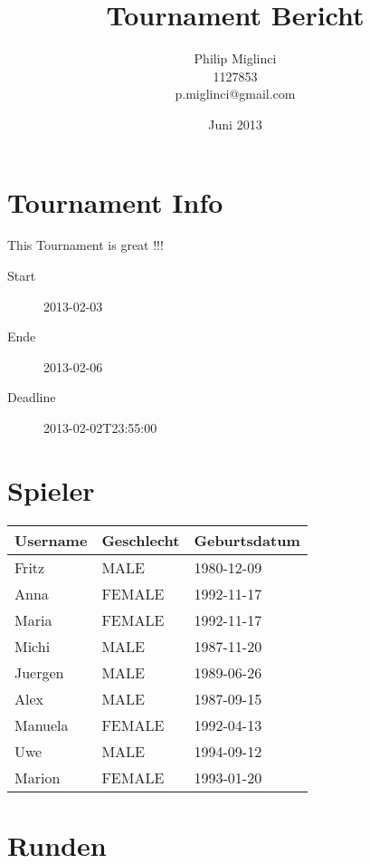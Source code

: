 \documentclass{article}
\begin{document}
\title{Tournament Bericht}
\author{Philip Miglinci\\
 1127853\\
 p.miglinci@gmail.com
}
\date{Juni 2013}
\maketitle
    
\section{Tournament Info}
  This Tournament is great !!!

\begin{description}
 \item[Start] 2013-02-03
 \item[Ende] 2013-02-06
 \item[Deadline] 2013-02-02T23:55:00
\end{description}
    
\section{Spieler}

\begin{center}
  \begin{table}[h]
      \begin{tabular}{lll}
        \textbf{Username} & \textbf{Geschlecht} & \textbf{Geburtsdatum} \\
        \hline
    Fritz & MALE & 1980-12-09 \\
  Anna & FEMALE & 1992-11-17 \\
  Maria & FEMALE & 1992-11-17 \\
  Michi & MALE & 1987-11-20 \\
  Juergen & MALE & 1989-06-26 \\
  Alex & MALE & 1987-09-15 \\
  Manuela & FEMALE & 1992-04-13 \\
  Uwe & MALE & 1994-09-12 \\
  Marion & FEMALE & 1993-01-20 \\
  
      \end{tabular}
  \end{table}
\end{center}
  
    \section{Runden}
    
\end{document}
